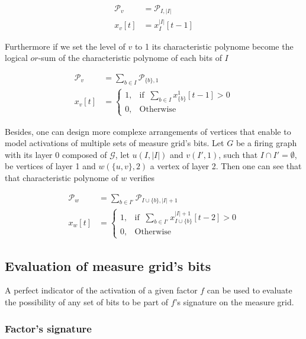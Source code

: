 \documentclass[a4paper, 11pt]{article}
\begin{document}
\begin{align*}
\mathcal{P}_{v} &= \mathcal{P}_{I, \vert I \vert}\\
x_v[t] &= x_{I}^{\vert I \vert}[t - 1] 
\end{align*}

Furthermore if we set the level of $v$ to 1 its characteristic polynome become the logical $or$-sum of the characteristic polynome of each bits of $I$

\begin{align*}
\mathcal{P}_{v} &= \sum_{b \in I} \mathcal{P}_{\{ b \}, 1}\\
x_v[t] &= \begin{cases} 1, & \text{if }\ \sum_{b \in I} x_{\{ b \}}^1[t - 1] > 0\\ 0, & \text{Otherwise} \end{cases}
\end{align*}


Besides, one can design more complexe arrangements of vertices that enable to model activations of multiple sets of measure grid's bits. Let $G$ be a firing graph with its layer 0 composed of $\mathcal{G}$, let $u(I, \vert I \vert)$ and $v(I', 1)$, such that $I \cap I' = \emptyset$, be vertices of layer 1 and $w(\{ u, v \}, 2)$ a vertex of layer 2. Then one can see that that characteristic polynome of $w$ verifies

\begin{align*}
\mathcal{P}_{w} &= \sum_{b \in I'} \mathcal{P}_{I \cup \{ b \}, \vert I \vert + 1}\\
x_w[t] &= \begin{cases} 1, & \text{if }\ \sum_{b \in I'} x_{I \cup \{ b \}}^{\vert I \vert +1}[t - 2] > 0\\ 0, & \text{Otherwise} \end{cases}
\end{align*}


\subsection{Evaluation of measure grid's bits}

A perfect indicator of the activation of a given factor $f$ can be used to evaluate the possibility of any set of bits to be part of $f$'s signature on the measure grid. 

\subsubsection*{Factor's signature}
\end{document}
